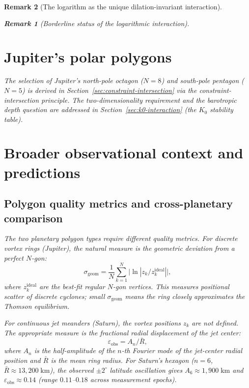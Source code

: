 \documentclass[12pt, a4paper]{article}
\newtheorem{remark}{Remark}[section]
\numberwithin{equation}{section}
\begin{document}
\begin{remark}[The logarithm as the unique dilation-invariant interaction]
\begin{remark}[Borderline status of the logarithmic interaction]
\section{Jupiter's polar polygons}
\label{sec:jupiter}

The selection of Jupiter's north-pole octagon ($N = 8$) and
south-pole pentagon ($N = 5$) is derived in
Section~\ref{sec:constraint-intersection} via the
constraint-intersection principle.  The two-dimensionality
requirement and the barotropic depth question are addressed in
Section~\ref{sec:k0-interaction} (the $K_0$ stability table).

\section{Broader observational context and predictions}
\label{sec:observations}
\label{sec:planets}

\subsection{Polygon quality metrics and cross-planetary comparison}

The two planetary polygon types require different quality metrics.
For \emph{discrete vortex rings} (Jupiter), the natural measure is the
geometric deviation from a perfect $N$-gon:
\begin{equation}\label{eq:sigma-geom}
  \sigma_{\mathrm{geom}} = \frac{1}{N}\sum_{k=1}^{N}
  \bigl|\!\ln|z_k / z_k^{\mathrm{ideal}}|\bigr|,
\end{equation}
where $z_k^{\mathrm{ideal}}$ are the best-fit regular $N$-gon vertices.
This measures positional scatter of discrete cyclones; small
$\sigma_{\mathrm{geom}}$ means the ring closely approximates the
Thomson equilibrium.

For \emph{continuous jet meanders} (Saturn), the vortex positions $z_k$
are not defined.  The appropriate measure is the fractional radial
displacement of the jet center:
\begin{equation}\label{eq:eps-obs}
  \varepsilon_{\mathrm{obs}} = A_n / \bar{R},
\end{equation}
where $A_n$ is the half-amplitude of the $n$-th Fourier mode of the
jet-center radial position and $\bar{R}$ is the mean ring radius.
For Saturn's hexagon ($n = 6$, $\bar{R} \approx 13{,}200\;\mathrm{km}$),
the observed $\pm 2^\circ$ latitude oscillation
\citep{Godfrey1988, Antunano2015} gives
$A_6 \approx 1{,}900\;\mathrm{km}$ and
$\varepsilon_{\mathrm{obs}} \approx 0.14$ (range $0.11$--$0.18$ across
measurement epochs).


\end{remark}
\end{remark}
\end{document}
